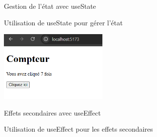 \documentclass{clbeamer2024}
\begin{document}
\begin{frame}{Gestion de l'état avec useState}
\begin{exampleblock}{Utilisation de useState pour gérer l'état}
\begin{figure}[h]
\begin{minipage}{0.4\textwidth}
					\label{fig:image2}
				\end{minipage}
			\end{figure}
			\centering
			\includegraphics[width=0.4\textwidth]{images/resultat2.png}
		
		\end{exampleblock}
	\end{frame}
	
	\begin{frame}{Effets secondaires avec useEffect}
		\begin{exampleblock}{Utilisation de useEffect pour les effets secondaires}
			

\end{exampleblock}
\end{frame}
\end{document}
